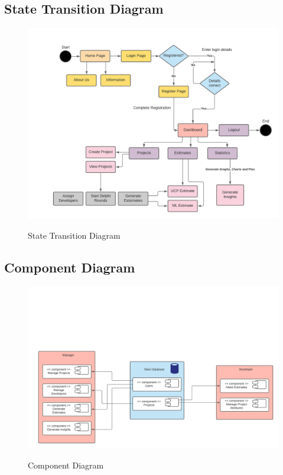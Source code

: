 \subsection{State Transition Diagram}
\begin{figure}[H]
    \centering
    \caption{State Transition Diagram}
    \includegraphics[scale=0.7]{./diagrams/state-transition.png}
    \label{fig:state-transition}
\end{figure}


\subsection{Component Diagram}
\begin{figure}[H]
    \centering
    \caption{Component Diagram}
    \includegraphics[scale=0.6]{./diagrams/component-diagram.png}
    \label{fig:component}
\end{figure}

